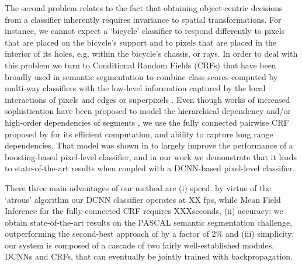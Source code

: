 The second problem relates to the fact that obtaining object-centric decisions from a classifier inherently requires invariance to spatial transformations. For instance, we cannot expect a `bicycle' classifier to respond differently to pixels that are  placed on the bicycle's support and to pixels that are placed in the interior of its holes, e.g. within the bicycle's chassis, or rays. In order to deal with this problem we turn to  Conditional Random Fields (CRFs) that have been broadly used in semantic segmentation to combine class scores computed by multi-way classifiers with the low-level information captured by the local interactions of   pixels and edges \citep{rother2004grabcut, shotton2009textonboost} or superpixels \citep{lucchi2011spatial}. Even though works of increased sophistication have been proposed 
 to model the hierarchical dependency \citep{he2004multiscale, ladicky2009associative, lempitsky2011pylon} and/or  high-order dependencies of segments \citep{delong2012fast, gonfaus2010harmony, kohli2009robust}, we use the  fully connected pairwise CRF proposed by \citet{krahenbuhl2011efficient} for its efficient computation, and ability to capture  long range dependencies. That model was shown in  \citet{krahenbuhl2011efficient} to largely improve the performance of a boosting-based pixel-level classifier, and in our work we demonstrate that it leads to state-of-the-art results when coupled with a DCNN-based pixel-level classifier. 


There  three main advantages of our method are (i) speed: by virtue of the `atrous' algorithm our DCNN classifier operates at XX fps, while Mean Field Inference for the fully-connected CRF requires XXXseconds, (ii) accuracy: we obtain state-of-the-art results on the PASCAL semantic segmentation challenge, outperforming the second-best approach of \citet{mostajabi2014feedforward} by a factor of 2$\%$ and (iii) simplicity: our system is composed of a cascade of two fairly well-established modules, DCNNs and CRFs, that can eventually be jointly trained with backpropagation. 


